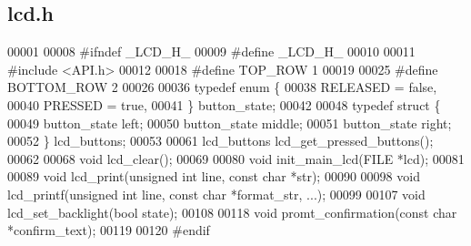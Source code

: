 \subsection{lcd.\+h}
\label{a00023_source}

\begin{DoxyCode}
00001 
00008 \textcolor{preprocessor}{#ifndef \_LCD\_H\_}
00009 \textcolor{preprocessor}{#define \_LCD\_H\_}
00010 
00011 \textcolor{preprocessor}{#include <API.h>}
00012 
00018 \textcolor{preprocessor}{#define TOP\_ROW 1}
00019 
00025 \textcolor{preprocessor}{#define BOTTOM\_ROW 2}
00026 
00036 \textcolor{keyword}{typedef} \textcolor{keyword}{enum} \{
00038   RELEASED = \textcolor{keyword}{false},
00040   PRESSED = \textcolor{keyword}{true},
00041 \} button_state;
00042 
00048 \textcolor{keyword}{typedef} \textcolor{keyword}{struct }\{
00049   button_state left;
00050   button_state middle;
00051   button_state right;
00052 \} lcd_buttons;
00053 
00061 lcd_buttons lcd_get_pressed_buttons();
00062 
00068 \textcolor{keywordtype}{void} lcd_clear();
00069 
00080 \textcolor{keywordtype}{void} init_main_lcd(FILE *lcd);
00081 
00089 \textcolor{keywordtype}{void} lcd_print(\textcolor{keywordtype}{unsigned} \textcolor{keywordtype}{int} line, \textcolor{keyword}{const} \textcolor{keywordtype}{char} *str);
00090 
00098 \textcolor{keywordtype}{void} lcd_printf(\textcolor{keywordtype}{unsigned} \textcolor{keywordtype}{int} line, \textcolor{keyword}{const} \textcolor{keywordtype}{char} *format\_str, ...);
00099 
00107 \textcolor{keywordtype}{void} lcd_set_backlight(\textcolor{keywordtype}{bool} state);
00108 
00118 \textcolor{keywordtype}{void} promt_confirmation(\textcolor{keyword}{const} \textcolor{keywordtype}{char} *confirm\_text);
00119 
00120 \textcolor{preprocessor}{#endif}
\end{DoxyCode}
